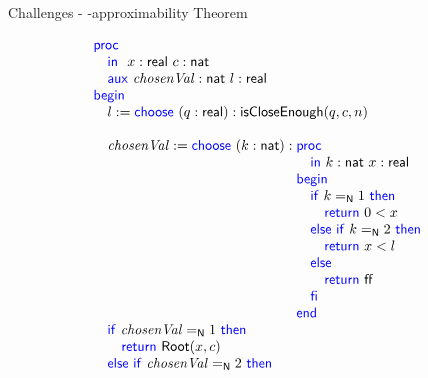 \begin{frame}{Challenges - \WhileCC-approximability Theorem}
\begin{minipage}[t]{0.4\linewidth}
        \pause
    \end{minipage}
    \begin{minipage}[t]{0.50\linewidth}
        \pause
        {
        \vspace{-1.5em}
        \center
        }
        \vspace{-1em}
        \scriptsize
         \[ 
            \BLOCK{             
                \PROC  \\
                    \INDENT{
                    \IN \ x:\real\ c:\nat \\
                    \AUX \chosenVal:\nat\ l:\real}\\
                \BEGIN \\
                    \INDENT{
                    l := \CHOOSE (q:\real) :
                                        \BLOCK{
                                        \isCloseEnough(q, c, n)} \\
                     \\
                    \chosenVal := \CHOOSE (k : \nat) :
                            \BLOCK{
                            \PROC \\
                                \INDENT{
                                \IN k:\nat\ x:\real}\\
                            \BEGIN \\
                                \INDENT{
                                \IF k \natEq 1 \THEN \\
                                    \INDENT{
                                    \RETURN 0<x}\\
                                \ELSE \IF k \natEq 2 \THEN \\
                                    \INDENT{
                                    \RETURN x<l}\\
                                \ELSE \\
                                    \INDENT{
                                    \RETURN \false}\\
                                \FI }\\
                            \END}\\
                    \IF \chosenVal \natEq 1 \THEN \\
                        \INDENT{
                        \RETURN \mathsf{Root}(x,c)}\\
                    \ELSE \IF \chosenVal \natEq 2 \THEN \\
}}\]
\end{minipage}
\end{frame}
